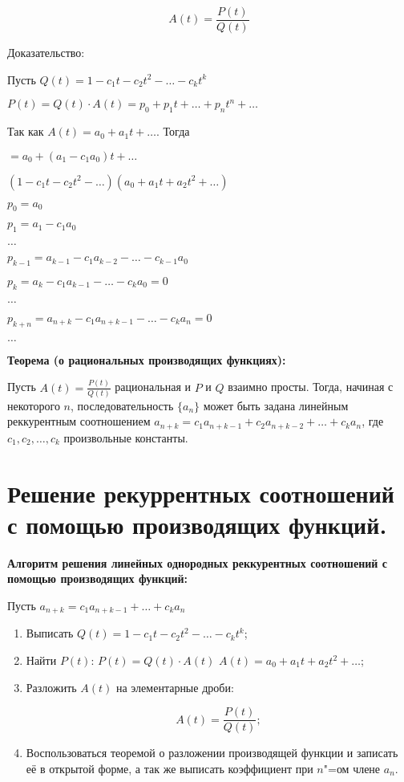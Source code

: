     \[
        A(t) = \frac{P(t)}{Q(t)}  
    \]
    \bigskip

    Доказательство:
    \bigskip

    Пусть $Q(t) = 1 - c_1t - c_2t^2 - \dots - c_kt^k$
    \smallskip

    $P(t) = Q(t) \cdot A(t) = p_0 + p_1t + \dots + p_nt^n + \dots$
    \smallskip

    Так как $A(t) = a_0 + a_1 t + \dots$. Тогда
    \smallskip

    $= a_0 + (a_1 - c_1a_0)t + \dots$
    \smallskip

    $(1 - c_1 t - c_2 t^2 - \dots)(a_0 + a_1 t + a_2 t^2 + \dots)$
    \smallskip

    $p_0 = a_0$
    \smallskip

    $p_1 = a_1 - c_1 a_0$
    \smallskip

    $\dots$
    \smallskip

    $p_{k - 1} = a_{k - 1} - c_1 a_{k - 2} - \dots - c_{k - 1}a_0$
    \smallskip

    $p_k = a_k - c_1 a_{k - 1} - \dots - c_k a_0 = 0$
    \smallskip

    $\dots$
    \smallskip

    $p_{k + n} = a_{n + k} - c_1 a_{n + k - 1} - \dots - c_k a_n = 0$
    \smallskip

    $\dots$
    \bigskip

\textbf{Теорема (о рациональных производящих функциях):}
    \smallskip
    
    Пусть $A(t) = \frac{P(t)}{Q(t)}$ рациональная и $P$ и $Q$ взаимно просты.
    Тогда, начиная с некоторого $n$, последовательность $\{a_n\}$ может
    быть задана линейным реккурентным соотношением $a_{n + k} =
    c_1 a_{n + k - 1} + c_2 a_{n + k - 2} + \dots + c_k a_n$,
    где $c_1, c_2, \dots, c_k$ произвольные константы.

\section{Решение рекуррентных соотношений с помощью производящих функций.}    

\textbf{Алгоритм решения линейных однородных реккурентных соотношений 
с помощью производящих функций:}
    \smallskip

    Пусть $a_{n + k} = c_1 a_{n + k - 1} + \dots + c_k a_n$
    
    \begin{enumerate}
        \item{Выписать $Q(t) = 1 - c_1t - c_2t^2 - \dots - c_kt^k$;}
        \item{Найти $P(t)$: $P(t) = Q(t) \cdot A(t)$ $A(t) = a_0 + a_1t + a_2t^2 +
        \dots$;}
        \item{Разложить $A(t)$ на элементарные дроби:
        
        \[
            A(t) = \frac{P(t)}{Q(t)};  
        \]}
        \item{Воспользоваться теоремой о разложении производящей функции
        и записать её в открытой форме, а так же выписать коэффициент при
        $n$"=ом члене $a_n$.}
    \end{enumerate}

